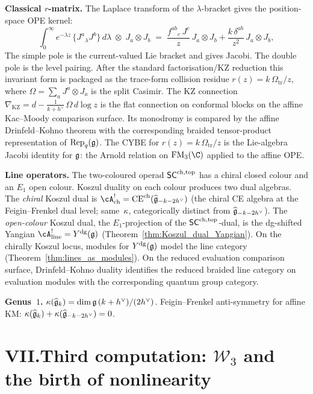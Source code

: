 \smallskip
\noindent\textbf{Classical $r$-matrix.}\enspace
The Laplace transform of the $\lambda$-bracket gives the
position-space OPE kernel:
\[
\int_0^\infty e^{-\lambda z}\,
 \{J^a{}_\lambda J^b\}\, d\lambda
\;\otimes\; J_a \otimes J_b
\;=\;
\frac{f^{ab}{}_c\,J^c}{z}\,J_a\otimes J_b
 + \frac{k\,\delta^{ab}}{z^2}\,J_a\otimes J_b ,
\]
The simple pole is the current-valued Lie bracket and gives Jacobi.
The double pole is the level pairing.  After the standard
factorisation/KZ reduction this invariant form is packaged as the
trace-form collision residue $r(z)=k\,\Omega_{\mathrm{tr}}/z$, where
$\Omega=\sum_a J^a\otimes J_a$ is the split Casimir.
The KZ connection $\nabla_{\mathrm{KZ}} = d - \frac{1}{k+h^\vee}\,\Omega\,d\log z$ is
the flat connection on conformal blocks on the affine Kac--Moody
comparison surface. Its monodromy is compared by the affine
Drinfeld--Kohno theorem with the corresponding braided
tensor-product representation of $\mathrm{Rep}_q(\mathfrak{g})$.
The CYBE for $r(z) =
k\,\Omega_{\mathrm{tr}}/z$ is the Lie-algebra Jacobi identity for $\mathfrak{g}$: the
Arnold relation on $\FM_3(\C)$ applied to the affine OPE.

\smallskip
\noindent\textbf{Line operators.}\enspace
The two-coloured operad $\mathsf{SC}^{\mathrm{ch,top}}$ has a chiral closed colour
and an $E_1$ open colour. Koszul duality on each colour
produces two dual algebras. The \emph{chiral} Koszul dual is
$\cA^!_{\mathrm{ch}} = \mathrm{CE}^{\mathrm{ch}}(\widehat{\fg}_{-k-2h^\vee})$
(the chiral CE algebra at the Feigin--Frenkel dual level;
same~$\kappa$, categorically distinct from $\widehat{\mathfrak{g}}_{-k-2h^\vee}$).
The \emph{open-colour} Koszul dual, the
$E_1$-projection of the $\mathsf{SC}^{\mathrm{ch,top}}$-dual, is the dg-shifted
Yangian $\cA^!_{\mathrm{line}} = \Ydg(\fg)$
\textup{(}Theorem~\textup{\ref{thm:Koszul_dual_Yangian}}\textup{)}.
On the chirally Koszul locus, modules for $Y^{\mathrm{dg}}(\mathfrak{g})$ model
the line category
\textup{(}Theorem~\textup{\ref{thm:lines_as_modules}}\textup{)}. On
the reduced evaluation comparison surface, Drinfeld--Kohno duality
identifies the reduced braided line category on evaluation modules
with the corresponding quantum group category.

\smallskip
\noindent\textbf{Genus~$1$.}\enspace
$\kappa(\widehat{\mathfrak{g}}_k) = \dim\mathfrak{g}\,(k + h^\vee)/(2h^\vee)$.
Feigin--Frenkel anti-symmetry for affine KM: $\kappa(\widehat{\mathfrak{g}}_k) + \kappa(\widehat{\mathfrak{g}}_{-k-2h^\vee}) = 0$.


\section*{VII.\quad Third computation: $\mathcal{W}_3$ and
the birth of nonlinearity}

